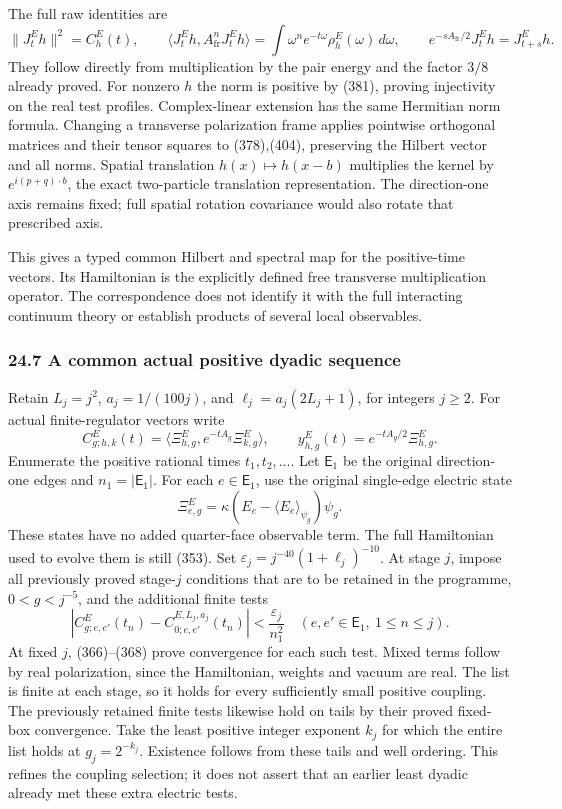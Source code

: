 \documentclass[
  11pt,
]{article}
\begin{document}
The full raw identities are \[
 \|J^E_t h\|^2=C^E_h(t),\qquad
 \langle J^E_t h,A_{\mathrm{fr}}^nJ^E_t h\rangle
   =\int\omega^ne^{-t\omega}\rho^E_h(\omega)\,d\omega,
 \qquad
 e^{-sA_{\mathrm{fr}}/2}J^E_t h=J^E_{t+s}h.
 \tag{405}
\] They follow directly from multiplication by the pair energy and the
factor \(3/8\) already proved. For nonzero \(h\) the norm is positive by
(381), proving injectivity on the real test profiles. Complex-linear
extension has the same Hermitian norm formula. Changing a transverse
polarization frame applies pointwise orthogonal matrices and their
tensor squares to (378),(404), preserving the Hilbert vector and all
norms. Spatial translation \(h(x)\mapsto h(x-b)\) multiplies the kernel
by \(e^{i(p+q)\cdot b}\), the exact two-particle translation
representation. The direction-one axis remains fixed; full spatial
rotation covariance would also rotate that prescribed axis.

This gives a typed common Hilbert and spectral map for the positive-time
vectors. Its Hamiltonian is the explicitly defined free transverse
multiplication operator. The correspondence does not identify it with
the full interacting continuum theory or establish products of several
local observables.

\subsubsection{24.7 A common actual positive dyadic
sequence}\label{a-common-actual-positive-dyadic-sequence}

Retain \(L_j=j^2\), \(a_j=1/(100j)\), and \(\ell_j=a_j(2L_j+1)\), for
integers \(j\ge2\). For actual finite-regulator vectors write \[
 C^E_{g;h,k}(t)=
 \langle\Xi^E_{h,g},e^{-tA_g}\Xi^E_{k,g}\rangle,\qquad
 y^E_{h,g}(t)=e^{-tA_g/2}\Xi^E_{h,g}.
 \tag{406}
\] Enumerate the positive rational times \(t_1,t_2,\ldots\). Let
\(\mathsf E_1\) be the original direction-one edges and
\(n_1=|\mathsf E_1|\). For each \(e\in\mathsf E_1\), use the original
single-edge electric state \[
 \Xi^E_{e,g}=\kappa(E_e-\langle E_e\rangle_{\psi_g})\psi_g.
 \tag{407}
\] These states have no added quarter-face observable term. The full
Hamiltonian used to evolve them is still (353). Set
\(\varepsilon_j=j^{-40}(1+\ell_j)^{-10}\). At stage \(j\), impose all
previously proved stage-\(j\) conditions that are to be retained in the
programme, \(0<g<j^{-5}\), and the additional finite tests \[
 \left|C^E_{g;e,e'}(t_n)
     -C^{E,L_j,a_j}_{0;e,e'}(t_n)\right|
       <\frac{\varepsilon_j}{n_1^2}
 \quad(e,e'\in\mathsf E_1,\ 1\le n\le j).
 \tag{408}
\] At fixed \(j\), (366)--(368) prove convergence for each such test.
Mixed terms follow by real polarization, since the Hamiltonian, weights
and vacuum are real. The list is finite at each stage, so it holds for
every sufficiently small positive coupling. The previously retained
finite tests likewise hold on tails by their proved fixed-box
convergence. Take the least positive integer exponent \(k_j\) for which
the entire list holds at \(g_j=2^{-k_j}\). Existence follows from these
tails and well ordering. This refines the coupling selection; it does
not assert that an earlier least dyadic already met these extra electric
tests.
\end{document}
